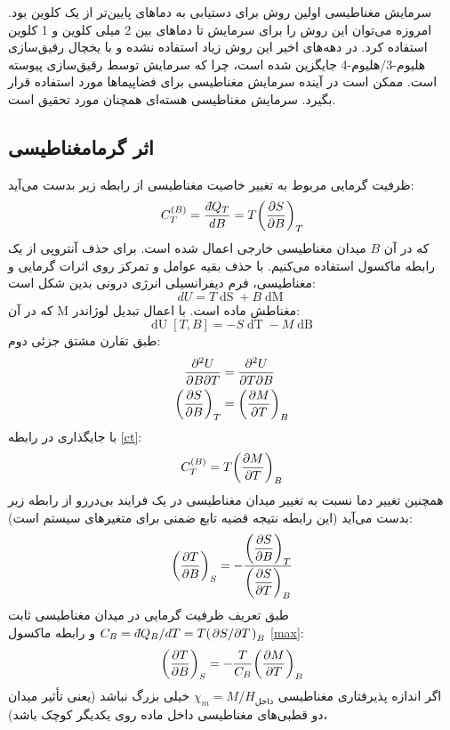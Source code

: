 \documentclass[12pt,a4paper]{article}
\newcommand\ddfrac[2]{{\displaystyle\frac{\displaystyle #1}{\displaystyle #2}}}
\newcommand\pdvc[3]{\qty(\pdv{#1}{#2})_{#3}}
\newcommand{\dbar}{{d\mkern-7mu\mathchar'26\mkern-2mu}}
\begin{document}
	سرمایش مغناطیسی اولین روش برای دستیابی به دماهای پایین‌تر از یک کلوین بود. امروزه می‌توان این روش را برای سرمایش تا دماهای بین 2 میلی کلوین و 1 کلوین استفاده کرد.
	در دهه‌های اخیر این روش زیاد استفاده نشده و با یخچال رقیق‌سازی هلیوم-3/هلیوم-4 جایگزین شده است، چرا که سرمایش توسط رقیق‌سازی پیوسته است.
	ممکن است در آینده سرمایش مغناطیسی برای فضاپیماها مورد استفاده قرار بگیرد. سرمایش مغناطیسی هسته‌ای همچنان مورد تحقیق است. \cite{pobell2007matter}
	\subsection{اثر گرمامغناطیسی}
	
	ظرفیت گرمایی مربوط به تغییر خاصیت مغناطیسی از رابطه زیر بدست می‌آید:
	\begin{equation}\label{ct}
		C_T^{(B)}=\frac{\dbar Q_T}{dB}=T\pdvc{S}{B}{T}
	\end{equation}
	که در آن $B$ میدان مغناطیسی خارجی اعمال شده است. برای حذف آنتروپی از یک رابطه ماکسول استفاده می‌کنیم.
	با حذف بقیه عوامل و تمرکز روی اثرات گرمایی و مغناطیسی، فرم دیفرانسیلی انرژی درونی بدین شکل است:
	\begin{equation}
		dU = T\mathop{dS} + B\mathop{dM}
	\end{equation}
	که در آن M مغناطش ماده است. با اعمال تبدیل لوژاندر:
	\begin{equation}
		\mathop{dU}[T,B] = - S\mathop{dT} - M\mathop{dB}
	\end{equation}
	طبق تقارن مشتق جزئی دوم:
	\begin{align}
		\pdv{U}{B}{T} &= \pdv{U}{T}{B} \\
		\pdvc{S}{B}{T} &= \pdvc{M}{T}{B} \label{max}
	\end{align}
	با جایگذاری در رابطه \eqref{ct}:
	\begin{equation} \label{ctb}
		C_T^{(B)}=T\pdvc{M}{T}{B}
	\end{equation}
	همچنین تغییر دما نسبت به تغییر میدان مغناطیسی در یک فرایند بی‌دررو از رابطه زیر بدست می‌آید (این رابطه نتیجه قضیه تابع ضمنی برای متغیرهای سیستم است):
	\begin{equation}
		\pdvc{T}{B}{S} = -\ddfrac{\pdvc{S}{B}{T}}{\pdvc{S}{T}{B}}
	\end{equation}
	طبق تعریف ظرفیت گرمایی در میدان مغناطیسی ثابت $C_B = \dbar Q_B / dT = T\qty(\pdv*{S}{T})_B$ و رابطه ماکسول \eqref{max}:
	\begin{equation} \label{adia1}
		\pdvc{T}{B}{S} = -\frac{T}{C_B}\pdvc{M}{T}{B}
	\end{equation}
	اگر اندازه پذیرفتاری مغناطیسی $\chi_m=M/H_{\text{داخل}}$ خیلی بزرگ نباشد (یعنی تأثیر میدان دو قطبی‌های مغناطیسی داخل ماده روی یکدیگر کوچک باشد)،
\end{document}
